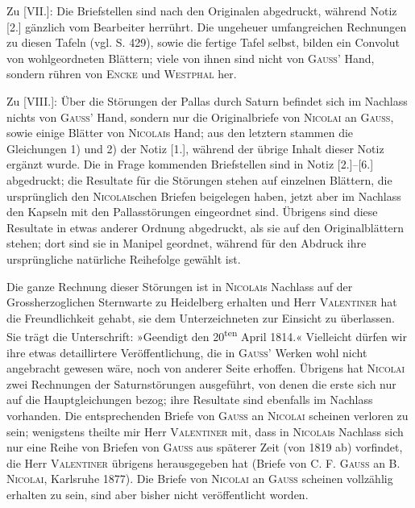\clearpage
\begingroup
{}
\renewcommand{\headrulewidth}{0pt}
\par\noindent\hspace*{\parindent}Zu [VII.]: Die Briefstellen sind nach den Originalen abgedruckt, während
Notiz [2.] gänzlich vom Bearbeiter herrührt. Die ungeheuer umfangreichen
Rechnungen zu diesen Tafeln (vgl. S. 429), sowie die fertige Tafel selbst, bilden
ein Convolut von wohlgeordneten Blättern; viele von ihnen sind nicht von
\textsc{Gauss}' Hand, sondern rühren von \textsc{Encke} und \textsc{Westphal} her.

\par\noindent\hspace*{\parindent}Zu [VIII.]: Über die Störungen der Pallas durch Saturn befindet sich im
Nachlass nichts von \textsc{Gauss}' Hand, sondern nur die Originalbriefe von
\textsc{Nicolai} an \textsc{Gauss}, sowie einige Blätter von \textsc{Nicolai}s Hand;
aus den letztern stammen die Gleichungen 1) und 2) der Notiz [1.], während der
übrige Inhalt dieser Notiz ergänzt wurde. Die in Frage kommenden Briefstellen
sind in Notiz [2.]--[6.] abgedruckt; die Resultate für die Störungen stehen auf
einzelnen Blättern, die ursprünglich den \textsc{Nicolai}schen Briefen beigelegen
haben, jetzt aber im Nachlass den Kapseln mit den Pallasstörungen eingeordnet sind.
Übrigens sind diese Resultate in etwas anderer Ordnung abgedruckt, als sie auf
den Originalblättern stehen; dort sind sie in Manipel geordnet, während für den
Abdruck ihre ursprüngliche natürliche Reihefolge gewählt ist.

\par\noindent\hspace*{\parindent}Die ganze Rechnung dieser Störungen ist in \textsc{Nicolai}s Nachlass
auf der Grossherzoglichen Sternwarte zu Heidelberg erhalten und Herr
\textsc{Valentiner} hat die Freundlichkeit gehabt, sie dem Unterzeichneten zur
Einsicht zu überlassen. Sie trägt die Unterschrift: »Geendigt den
20\textsuperscript{ten} April 1814.« Vielleicht dürfen wir ihre etwas detaillirtere
Veröffentlichung, die in \textsc{Gauss}' Werken wohl nicht angebracht gewesen wäre,
noch von anderer Seite erhoffen. Übrigens hat \textsc{Nicolai} zwei Rechnungen der
Saturnstörungen ausgeführt, von denen die erste sich nur auf die Hauptgleichungen
bezog; ihre Resultate sind ebenfalls im Nachlass vorhanden. Die entsprechenden
Briefe von \textsc{Gauss} an \textsc{Nicolai} scheinen verloren zu sein; wenigstens
theilte mir Herr \textsc{Valentiner} mit, dass in \textsc{Nicolai}s Nachlass sich nur
eine Reihe von Briefen von \textsc{Gauss} aus späterer Zeit (von 1819 ab) vorfindet,
die Herr \textsc{Valentiner} übrigens herausgegeben hat (Briefe von C. F.
\textsc{Gauss} an B. \textsc{Nicolai}, Karlsruhe 1877). Die Briefe von \textsc{Nicolai}
an \textsc{Gauss} scheinen vollzählig erhalten zu sein, sind aber bisher nicht
veröffentlicht worden.

